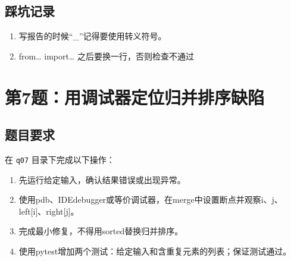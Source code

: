 \documentclass[12pt, a4paper]{article}
\numberwithin{equation}{section}
\begin{document}
\subsection{踩坑记录}
\begin{enumerate}
    \item 写报告的时候“\_”记得要使用转义符号。   
    \item from… import… 之后要换一行，否则检查不通过
\end{enumerate}

\section{第7题：用调试器定位归并排序缺陷}
\label{sec:q07}

\subsection{题目要求}
在 \texttt{q07} 目录下完成以下操作：
\begin{enumerate}
    \item 先运行给定输入，确认结果错误或出现异常。
    \item 使用pdb、IDEdebugger或等价调试器，在merge中设置断点并观察i、j、left[i]、right[j]。
    \item 完成最小修复，不得用sorted替换归并排序。
    \item 使用pytest增加两个测试：给定输入和含重复元素的列表；保证测试通过。
\end{enumerate}
\end{document}
